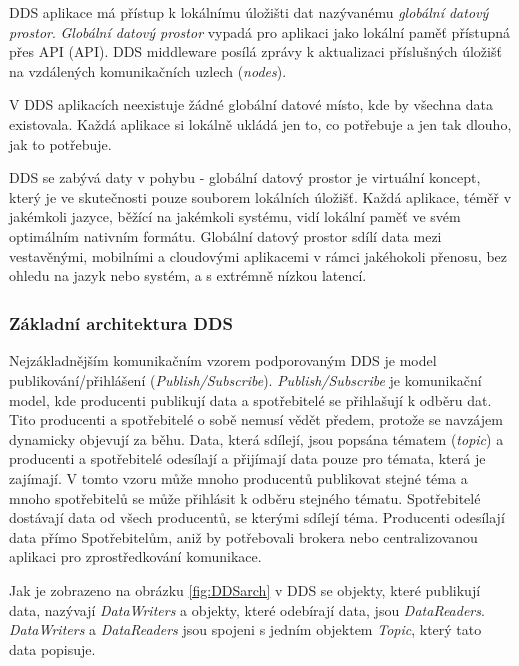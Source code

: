 \acs{DDS} aplikace má přístup k lokálnímu úložišti dat nazývanému \textit{globální datový prostor}. \textit{Globální datový prostor} vypadá pro aplikaci jako lokální paměť přístupná přes \acs{API} (\acl{API}). \acs{DDS} middleware posílá zprávy k aktualizaci příslušných úložišť na vzdálených komunikačních uzlech (\textit{nodes}).

V \acs{DDS} aplikacích neexistuje žádné globální datové místo, kde by všechna data existovala. Každá aplikace si lokálně ukládá jen to, co potřebuje a jen tak dlouho, jak to potřebuje. \cite{DDS_Main}

\acs{DDS} se zabývá daty v pohybu - globální datový prostor je virtuální koncept, který je ve skutečnosti pouze souborem lokálních úložišť. Každá aplikace, téměř v jakémkoli jazyce, běžící na jakémkoli systému, vidí lokální paměť ve svém optimálním nativním formátu. Globální datový prostor sdílí data mezi vestavěnými, mobilními a cloudovými aplikacemi v rámci jakéhokoli přenosu, bez ohledu na jazyk nebo systém, a s extrémně nízkou latencí.

\subsubsection{Základní architektura DDS\texorpdfstring{\textsuperscript{\textregistered}}{ (R)}}

Nejzákladnějším komunikačním vzorem podporovaným \acs{DDS} je model publikování/přihlášení (\textit{Publish/Subscribe}). \textit{Publish/Subscribe} je komunikační model, kde producenti publikují data a spotřebitelé se přihlašují k odběru dat. Tito producenti a spotřebitelé o sobě nemusí vědět předem, protože se navzájem dynamicky objevují za běhu. Data, která sdílejí, jsou popsána tématem (\textit{topic}) a producenti a spotřebitelé odesílají a přijímají data pouze pro témata, která je zajímají. V tomto vzoru může mnoho producentů publikovat stejné téma a mnoho spotřebitelů se může přihlásit k odběru stejného tématu. Spotřebitelé dostávají data od všech producentů, se kterými sdílejí téma. Producenti odesílají data přímo Spotřebitelům, aniž by potřebovali brokera nebo centralizovanou aplikaci pro zprostředkování komunikace. \cite{DDS_PubSub}

Jak je zobrazeno na obrázku \ref{fig:DDSarch} v \acs{DDS} se objekty, které publikují data, nazývají \textit{DataWriters} a objekty, které odebírají data, jsou \textit{DataReaders}. \textit{DataWriters} a \textit{DataReaders} jsou spojeni s jedním objektem \textit{Topic}, který tato data popisuje.

